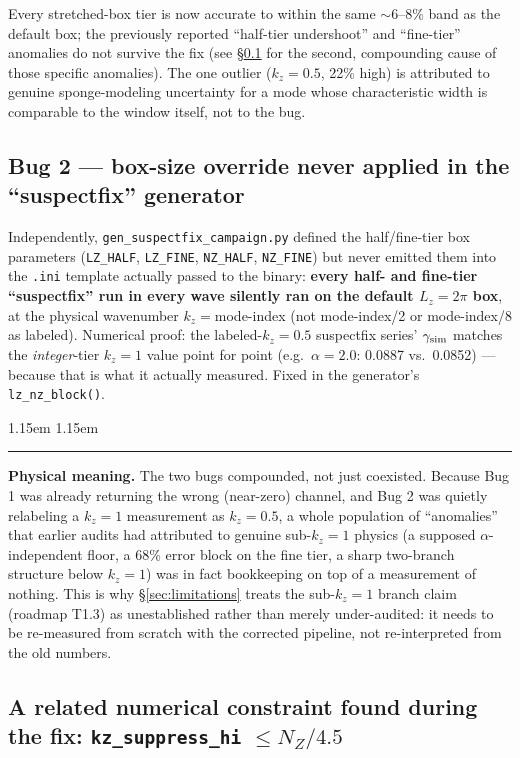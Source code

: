 \documentclass[11pt,a4paper]{article}
\numberwithin{equation}{section}
\theoremstyle{remark}
\newenvironment{physmeaning}%
{\par\medskip\noindent
 \begin{list}{}{\leftmargin 1.15em \rightmargin 1.15em \listparindent 0pt
 \itemindent 0pt \parsep 2pt \topsep 2pt}\item\relax
 \small\textcolor{meancol}{\rule[-0.6ex]{2.6pt}{2.4ex}}\hspace{0.55em}%
 \textcolor{meancol}{\textbf{Physical meaning.}}\hspace{0.5em}\ignorespaces}%
{\end{list}\medskip}
\newcommand{\kz}{k_z}
\begin{document}
Every stretched-box tier is now accurate to within the same $\sim$6--8\%
band as the default box; the previously reported ``half-tier undershoot''
and ``fine-tier'' anomalies do not survive the fix (see \S\ref{ssec:bug2}
for the second, compounding cause of those specific anomalies). The one
outlier ($\kz=0.5$, 22\% high) is attributed to genuine sponge-modeling
uncertainty for a mode whose characteristic width is comparable to the
window itself, not to the bug.

\subsection{Bug 2 --- box-size override never applied in the
``suspectfix'' generator}
\label{ssec:bug2}

Independently, \texttt{gen\_suspectfix\_campaign.py} defined the
half/fine-tier box parameters (\texttt{LZ\_HALF}, \texttt{LZ\_FINE},
\texttt{NZ\_HALF}, \texttt{NZ\_FINE}) but never emitted them into the
\texttt{.ini} template actually passed to the binary: \textbf{every
half- and fine-tier ``suspectfix'' run in every wave silently ran on the
default $L_z=2\pi$ box}, at the physical wavenumber $\kz={}$mode-index
(not mode-index/2 or mode-index/8 as labeled). Numerical proof: the
labeled-$\kz=0.5$ suspectfix series' $\gamma_{\rm sim}$ matches the
\emph{integer}-tier $\kz=1$ value point for point (e.g.\ $\alpha=2.0$:
0.0887 vs.\ 0.0852) --- because that is what it actually measured. Fixed
in the generator's \texttt{lz\_nz\_block()}.

\begin{physmeaning}
The two bugs compounded, not just coexisted. Because Bug 1 was already
returning the wrong (near-zero) channel, and Bug 2 was quietly relabeling
a $\kz=1$ measurement as $\kz=0.5$, a whole population of ``anomalies''
that earlier audits had attributed to genuine sub-$\kz=1$ physics (a
supposed $\alpha$-independent floor, a 68\% error block on the fine
tier, a sharp two-branch structure below $\kz=1$) was in fact
bookkeeping on top of a measurement of nothing. This is why
\S\ref{sec:limitations} treats the sub-$\kz=1$ branch claim (roadmap
T1.3) as unestablished rather than merely under-audited: it needs to be
re-measured from scratch with the corrected pipeline, not re-interpreted
from the old numbers.
\end{physmeaning}

\subsection{A related numerical constraint found during the fix:
\texttt{kz\_suppress\_hi} $\le N_Z/4.5$}
\end{document}
